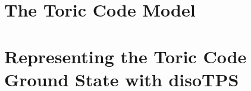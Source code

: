 \section{The Toric Code Model}
\label{sec:the_toric_code_model}


\section{Representing the Toric Code Ground State with disoTPS}
\label{sec:representing_the_toric_code_gs_with_disoTPS}
